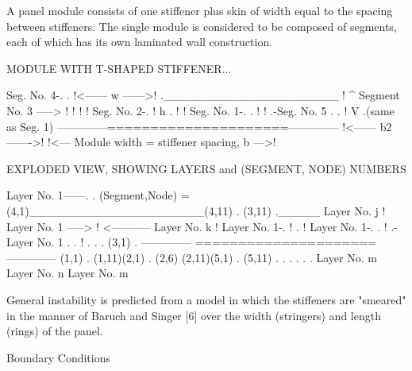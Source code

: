 A panel module consists of one stiffener plus skin of width equal to the
spacing between stiffeners. The single module is considered to be composed
of segments, each of which has its own laminated wall construction. 


      MODULE WITH T-SHAPED STIFFENER...

       Seg. No. 4-.
                    . !<------  w  ------>!
                     ._____________________
                                !   ^
           Segment No. 3 -----> !   !
                                !   !
               Seg. No. 2-.     !   h
                           .    !   !
         Seg. No. 1-.       .   !   !          .-Seg. No. 5
                   .         .  !   V         .(same as Seg. 1)
        --------------=====================--------------
                      !<------ b2 ------->!
        !<--- Module width  =  stiffener spacing, b --->!


    EXPLODED VIEW, SHOWING LAYERS and (SEGMENT, NODE) NUMBERS

                   Layer No. 1------.
                                     .
 (Segment,Node) = (4,1)_____________________(4,11)
                                       .
                              (3,11)     ._____ Layer No. j
                                !  
             Layer No. 1 -----> ! <----------- Layer No. k
                                !   
          Layer No. 1-.         !   
                       .        !   
    Layer No. 1-.       .       !               .-Layer No. 1
               .         .      !                .
              .           .   (3,1)               .
    --------------    =====================    --------------
  (1,1)   .   (1,11)(2,1)   . (2,6)    (2,11)(5,1)  .    (5,11)
           .                 .                       .
            .                 .                       .
             Layer No. m       Layer No. n    Layer No. m



General instability is predicted from a model in which the stiffeners are
"smeared" in the manner of Baruch and Singer [6] over the width
(stringers) and length (rings) of the panel. 


Boundary Conditions

